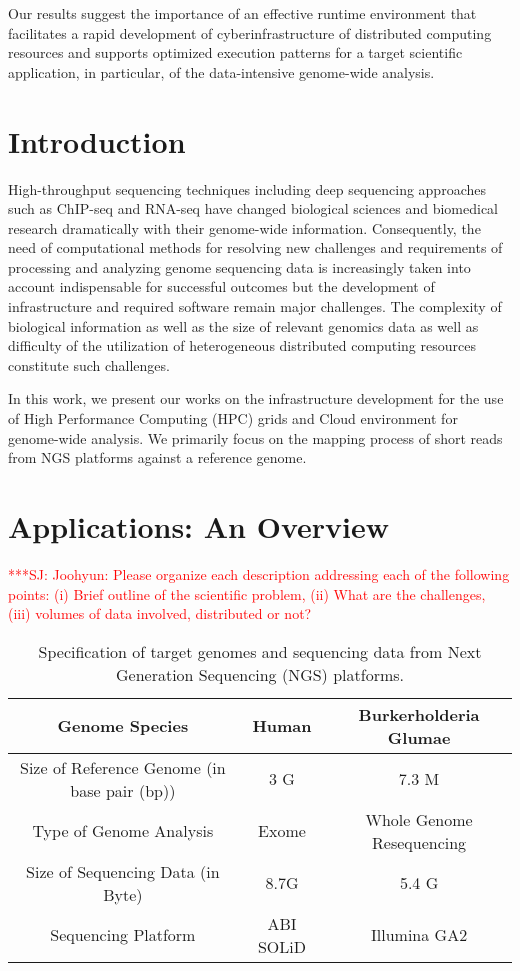 \documentclass[12pt]{article}
\newcommand{\jhanote}[1]{ {\textcolor{red}     {***SJ: #1}}}
\newcommand{\jhanote}[1]{}
\begin{document}
Our results suggest the importance of an effective runtime environment
that facilitates a rapid development of cyberinfrastructure of
distributed computing resources and supports optimized execution
patterns for a target scientific application, in particular, of the
data-intensive genome-wide analysis.

\section{Introduction}

% 
% 

High-throughput sequencing techniques including deep sequencing approaches such as ChIP-seq and RNA-seq have changed biological sciences and biomedical research dramatically with their genome-wide information.  Consequently, the need of computational methods for resolving new challenges and requirements of processing and analyzing genome sequencing data is increasingly taken into account indispensable for successful outcomes but the development of infrastructure and required software remain major challenges.  The complexity of biological information as well as the size of relevant genomics data as well as difficulty of the utilization of heterogeneous distributed computing resources constitute such challenges.      

In this work, we present our works on the infrastructure development for the use of High Performance Computing (HPC) grids and Cloud environment for genome-wide analysis.  We primarily focus on the mapping process of short reads from NGS platforms against a reference genome.  

\section{Applications: An Overview}

\jhanote{Joohyun: Please organize each description addressing each of
  the following points: (i) Brief outline of the scientific problem,
  (ii) What are the challenges, (iii) volumes of data involved,
  distributed or not?}


 \begin{table}
 \begin{tabular}{|c|cc|} 
 \hline 
Genome Species & Human  & Burkerholderia Glumae  \\ \hline
 Size of Reference Genome (in base pair (bp)) &  3 G & 7.3 M \\
 Type of Genome Analysis &  Exome  & Whole Genome Resequencing \\
 Size of Sequencing Data (in Byte) & 8.7G & 5.4 G \\
 Sequencing Platform & ABI SOLiD  &  Illumina GA2 \\
 \hline
 \end{tabular}

 \caption{Specification of target genomes and sequencing data from Next Generation Sequencing (NGS) platforms.}
 \label{table:two-genomes} 
 \end{table}
\end{document}

